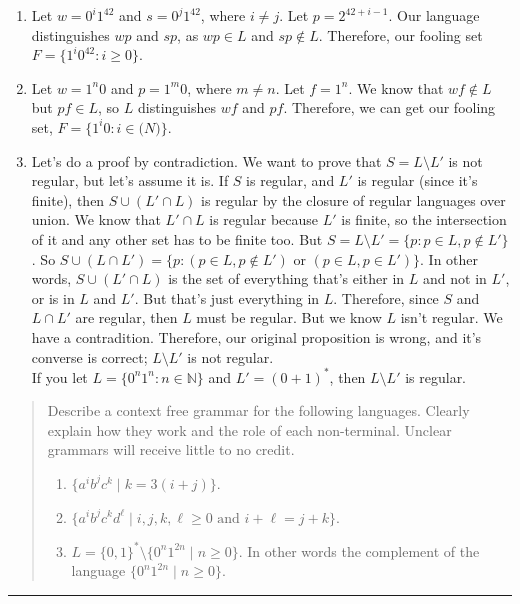 \documentclass[11pt]{article}
\begin{document}
\begin{solution}
    \begin{enumerate}
        \item Let $w = 0^i1^{42}$ and $s = 0^j1^{42}$, where $i \neq j$. Let $p = 2^{42 + i - 1}$. Our language distinguishes $wp$ and $sp$, as $wp \in L$ and $sp \not\in L$. Therefore, our fooling set $F = \{1^i0^{42} : i \geq 0\}$.
        \item Let $w = 1^n0$ and $p = 1^m0$, where $m \neq n$. Let $f = 1^n$. We know that $wf \not\in L$ but $pf \in L$, so $L$ distinguishes $wf$ and $pf$. Therefore, we can get our fooling set, $F = \{1^i0 : i \in \mathbb(N)\}$.
        \item Let's do a proof by contradiction. We want to prove that $S = L \setminus L'$ is not regular, but let's assume it is. If $S$ is regular, and $L'$ is regular (since it's finite), then $S \cup (L' \cap L)$ is regular by the closure of regular languages over union. We know that $L' \cap L$ is regular because $L'$ is finite, so the intersection of it and any other set has to be finite too. But $S = L \setminus L' = \{p : p \in L, p \not\in L'\}$. So $S \cup (L \cap L') = \{p : (p \in L, p \not\in L') \text{ or } (p \in L, p \in L')\}$. In other words, $S \cup (L' \cap L)$ is the set of everything that's either in $L$ and not in $L'$, or is in $L$ and $L'$. But that's just everything in $L$. Therefore, since $S$ and $L \cap L'$ are regular, then $L$ must be regular. But we know $L$ isn't regular. We have a contradition. Therefore, our original proposition is wrong, and it's converse is correct; $L \setminus L'$ is not regular. \\
            If you let $L = \{0^n1^n : n \in \mathbb{N}\}$ and $L' = (0+1)^*$, then $L \setminus L'$ is regular.
    \end{enumerate}
\end{solution}


\begin{quote}
    Describe a context free grammar for the following languages.
    Clearly explain how they work and the role of each non-terminal.
    Unclear grammars will receive little to no credit.
    \begin{enumerate}
        \item $\{a^ib^jc^k \mid k = 3(i+j)\}$.
        \item $\{a^ib^jc^kd^\ell \mid  i,j,k,\ell \ge 0 \mbox{~and~} i+\ell = j+k\}$.
        \item $L = \{0,1\}^* \setminus \{ 0^n1^{2n} \mid n \ge 0\}$. In other words
            the complement of the language $\{ 0^n1^{2n} \mid n \ge 0\}$.
    \end{enumerate}
\end{quote}
\hrule
\end{document}
